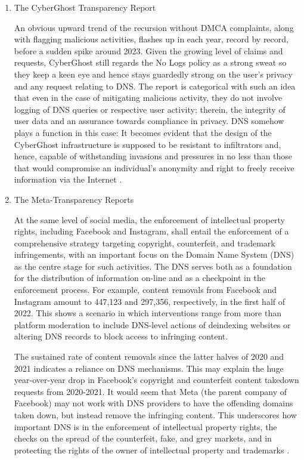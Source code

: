 \begin{enumerate}
\item The CyberGhost Transparency Report

An obvious upward trend of the recursion without DMCA complaints, along with flagging malicious activities, flashes up in each year, record by record, before a sudden spike around 2023. Given the growing level of claims and requests, CyberGhost still regards the No Logs policy as a strong sweat so they keep a keen eye and hence stays guardedly strong on the user's privacy and any request relating to DNS. The report is categorical with such an idea that even in the case of mitigating malicious activity, they do not involve logging of DNS queries or respective user activity; therein, the integrity of user data and an assurance towards compliance in privacy. DNS somehow plays a function in this case: It becomes evident that the design of the CyberGhost infrastructure is supposed to be resistant to infiltrators and, hence, capable of withstanding invasions and pressures in no less than those that would compromise an individual's anonymity and right to freely receive information via the Internet \cite{CyberGhostVPN2023}.

\item The Meta-Transparency Reports

At the same level of social media, the enforcement of intellectual property rights, including Facebook and Instagram, shall entail the enforcement of a comprehensive strategy targeting copyright, counterfeit, and trademark infringements, with an important focus on the Domain Name System (DNS) as the centre stage for such activities. The DNS serves both as a foundation for the distribution of information on-line and as a checkpoint in the enforcement process. For example, content removals from Facebook and Instagram amount to 447,123 and 297,356, respectively, in the first half of 2022. This shows a scenario in which interventions range from more than platform moderation to include DNS-level actions of deindexing websites or altering DNS records to block access to infringing content.

The sustained rate of content removals since the latter halves of 2020 and 2021 indicates a reliance on DNS mechanisms. This may explain the huge year-over-year drop in Facebook's copyright and counterfeit content takedown requests from 2020-2021. It would seem that Meta (the parent company of Facebook) may not work with DNS providers to have the offending domains taken down, but instead remove the infringing content. This underscores how important DNS is in the enforcement of intellectual property rights, the checks on the spread of the counterfeit, fake, and grey markets, and in protecting the rights of the owner of intellectual property and trademarks  \cite{Facebook2023}.


\end{enumerate}
